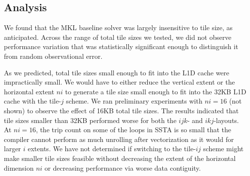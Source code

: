 \documentclass[10pt, conference, compsocconf]{IEEEtran}
\begin{document}
\subsection{Analysis}
\label{sec:results:analysis}

We found that the MKL baseline solver was largely insensitive to tile size, as
  anticipated.
Across the range of total tile sizes we tested, we did not observe performance
  variation that was statistically significant enough to distinguish it from
  random observational error.

As we predicted, total tile sizes small enough to fit into the L1D cache were
  impractically small.
We would have to either reduce the vertical extent or the horizontal
  extent \(ni\) to generate a tile size small enough to fit into the 32KB L1D
  cache with the tile-\(j\) scheme.
We ran preliminary experiments with \(ni=16\) (not shown) to observe the effect
  of 16KB total tile sizes.
The results indicated that tile sizes smaller than 32KB performed worse for both
  the \(ijk\)- and \(ikj\)-layouts.
At \(ni=16\), the trip count on some of the loops in SSTA is so small that the
  compiler cannot perform as much unrolling after vectorization as it would for
  larger \(i\) extents.
We have not determined if switching to the tile-\(ij\) scheme might make
  smaller tile sizes feasible without decreasing the extent of the horizontal
  dimension \(ni\) or decreasing performance via worse data contiguity.
\end{document}
